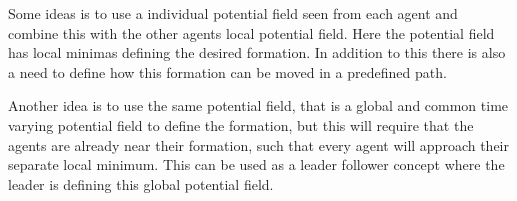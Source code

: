 Some ideas is to use a individual potential field seen from each
agent and combine this with the other agents local potential field.
Here the potential field has local minimas defining the desired
formation. In addition to this there is also a need to define how this
formation can be moved in a predefined path.

Another idea is to use the same potential field, that is a global and
common time varying potential field to define the formation, but this
will require that the agents are already near their formation, such
that every agent will approach their separate local minimum. This can
be used as a leader follower concept where the leader is defining this
global potential field.

